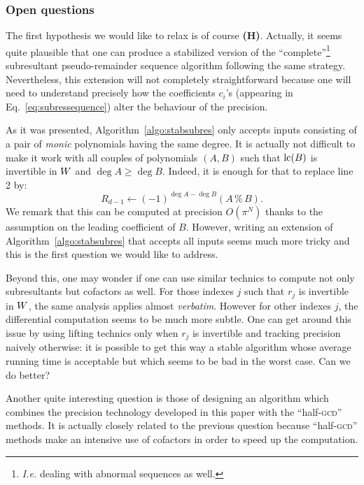 \documentclass{article}
\begin{document}
\subsubsection*{Open questions}
\label{subsec:questions}

The first hypothesis we would like to relax is of course {\bf (H)}. 
Actually, it seems quite plausible that one can produce a stabilized 
version of the ``complete''\footnote{\emph{I.e.} dealing with abnormal 
sequences as well.} subresultant pseudo-remainder sequence algorithm 
following the same strategy. Nevertheless, this extension will not 
completely straightforward because one will need to understand precisely 
how the coefficients $c_i$'s (appearing in Eq.~\ref{eq:subressequence}) 
alter the behaviour of the precision.

As it was presented, Algorithm~\ref{algo:stabsubres} only accepts inputs 
consisting of a pair of \emph{monic} polynomials having the same degree. 
It is actually not difficult to make it work with all couples of 
polynomials $(A,B)$ such that $\text{\rm lc}(B)$ is invertible in $W$ and $\deg A 
\geq \deg B$. Indeed, it is enough for that to replace line 2 by:
$$R_{d-1} \leftarrow (-1)^{\deg A - \deg B} (A \,\%\, B).$$
We remark that this can be computed at precision $O(\pi^N)$ thanks to 
the assumption on the leading coefficient of $B$.
However, writing an extension of Algorithm~\ref{algo:stabsubres} that 
accepts all inputs seems much more tricky and this is the first question 
we would like to address.

Beyond this, one may wonder if one can use similar technics to compute 
not only subresultants but cofactors as well. For those indexes $j$ such 
that $r_j$ is invertible in $W$, the same analysis applies almost 
\emph{verbatim}. However for other indexes $j$, the differential 
computation seems to be much more subtle. One can get around this issue 
by using lifting technics only when $r_j$ is invertible and tracking 
precision naively otherwise: it is possible to get this way a stable 
algorithm whose average running time is acceptable but which seems to be 
bad in the worst case. Can we do better?

Another quite interesting question is those of designing an algorithm 
which combines the precision technology developed in this paper with the 
``half-\textsc{gcd}'' methods. It is actually closely related to the 
previous question because ``half-\textsc{gcd}'' methods make an 
intensive use of cofactors in order to speed up the computation.
\end{document}
